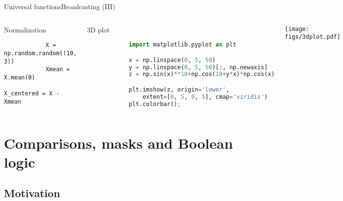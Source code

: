 \documentclass[10pt,compress]{beamer} %
\begin{document}
\begin{frame}[fragile]{Universal functions}{Broadcasting (III)}
	\vspace{-0.2cm} 
	\begin{columns}
		\begin{exampleblock}{Normalization}
		\vspace{-0.2cm} 
			\begin{lstlisting}
			X = np.random.random((10, 3))
			Xmean = X.mean(0)
			X_centered = X - Xmean
			\end{lstlisting}
		\vspace{-0.2cm} 
		\end{exampleblock}

		\begin{exampleblock}{3D plot}
		\vspace{-0.2cm} 
			\begin{lstlisting}[language=Python]
			%matplotlib inline
			import matplotlib.pyplot as plt

			x = np.linspace(0, 5, 50)
			y = np.linspace(0, 5, 50)[:, np.newaxis]
			z = np.sin(x)**10+np.cos(10+y*x)*np.cos(x)

			plt.imshow(z, origin='lower', 
			    extent=[0, 5, 0, 5], cmap='viridis')
			plt.colorbar();
			\end{lstlisting}
		\vspace{-0.2cm} 
		\end{exampleblock}

			\texttt{[image: figs/3dplot.pdf]}	
	\end{columns}
\end{frame}

\section{Comparisons, masks and Boolean logic}
\subsection{Motivation}
\end{document}
